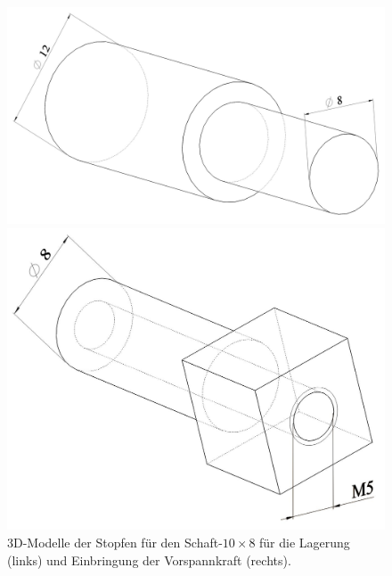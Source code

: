 	
	\begin{figure}[H]
		\centering
		\begin{minipage}[t]{0.5\linewidth}
			\centering
			\includegraphics[width=1.0\linewidth, height=0.23\textheight]{Experimentelle_Untersuchungen/10x8_Lagerung_Stopfen}
		\end{minipage}%
		\hfill
		\begin{minipage}[t]{0.45\linewidth}
			\centering
			\includegraphics[width=1.0\linewidth, height=0.23\textheight]{Experimentelle_Untersuchungen/10x8_Schraube_Stopfen}
		\end{minipage}
	\caption{3D-Modelle der Stopfen für den Schaft-$ 10\times8 $ für die Lagerung (links) und Einbringung der Vorspannkraft (rechts).}
	\label{fig:Stopfen-Schaft-10x8}
	\end{figure}
	
